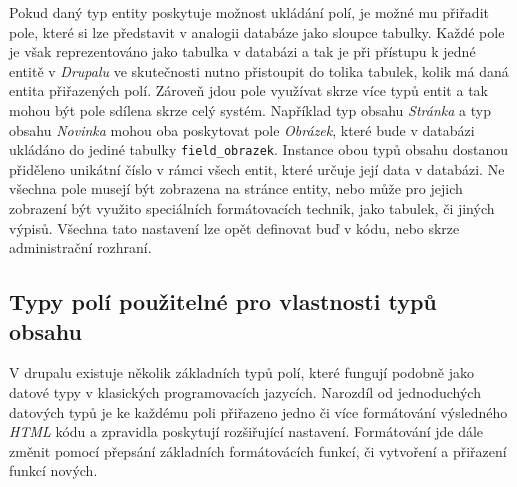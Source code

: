 Pokud daný typ entity poskytuje možnost ukládání polí, je možné mu přiřadit pole, které si lze představit v analogii databáze jako sloupce tabulky. Každé pole je však reprezentováno jako tabulka v databázi a tak je při přístupu k jedné entitě v \emph{Drupalu} ve skutečnosti nutno přistoupit do tolika tabulek, kolik má daná entita přiřazených polí. Zároveň jdou pole využívat skrze více typů entit a tak mohou být pole sdílena skrze celý systém. Například typ obsahu \emph{Stránka} a typ obsahu \emph{Novinka} mohou oba poskytovat pole \emph{Obrázek}, které bude v databázi ukládáno do jediné tabulky \texttt{field\_obrazek}. Instance obou typů obsahu dostanou přiděleno unikátní číslo v rámci všech entit, které určuje její data v databázi. Ne všechna pole musejí být zobrazena na stránce entity, nebo může pro jejich zobrazení být využito speciálních formátovacích technik, jako tabulek, či jiných výpisů. Všechna tato nastavení lze opět definovat buď v kódu, nebo skrze administrační rozhraní.

\subsection{Typy polí použitelné pro vlastnosti typů obsahu}
V drupalu existuje několik základních typů polí, které fungují podobně jako datové typy v klasických programovacích jazycích. Narozdíl od jednoduchých datových typů je ke každému poli přiřazeno jedno či více formátování výsledného \emph{HTML} kódu a zpravidla poskytují rozšiřující nastavení. Formátování jde dále změnit pomocí přepsání základních formátovácích funkcí, či vytvoření a přiřazení funkcí nových.

